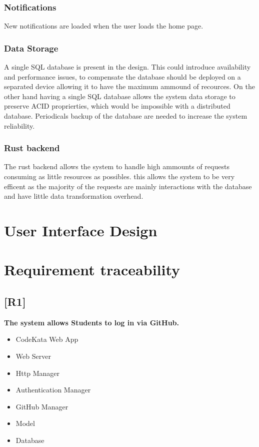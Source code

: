 \documentclass{article}
\begin{document}
\subsubsection{Notifications}
New notifications are loaded when the user loads the home page.
\subsubsection{Data Storage}
A single SQL database is present in the design. This could introduce availability and performance issues, to compensate the database should be deployed on a separated device allowing it to have the maximum ammound of recources. On the other hand having a single SQL database allows the system data storage to preserve ACID proprierties, which would be impossible with a distributed database. Periodicals backup of the database are needed to increase the system reliability.
\subsubsection{Rust backend}
The rust backend allows the system to handle high ammounts of requests consuming as little resources as possibles. this allows the system to be very efficent as the majority of the requests are mainly interactions with the database and have little data transformation overhead.

\newpage
\section{User Interface Design}


\newpage
\section{Requirement traceability}
\subsection{[R1]}
\textbf{ The system allows Students to log in via GitHub.}
\begin{itemize}
\item CodeKata Web App
\item Web Server
\item Http Manager
\item Authentication Manager
\item GitHub Manager
\item Model
\item Database
\end{itemize}
\end{document}
